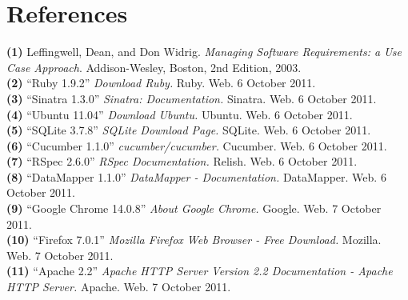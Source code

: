 \documentclass{article}
\begin{document}
\section{References}
\hangindent=1.4cm
\textbf{(1)} Leffingwell, Dean, and Don Widrig.
\emph{Managing Software Requirements: a Use Case Approach}.
Addison-Wesley, Boston,
2nd Edition,
2003.\\

\noindent\hangindent=1.4cm
\textbf{(2)} ``Ruby 1.9.2''
\emph{Download Ruby.} Ruby. Web.  6 October 2011. \\

\noindent\hangindent=1.4cm
\textbf{(3)} ``Sinatra 1.3.0''
\emph{Sinatra: Documentation.} Sinatra. Web.  6 October 2011.\\

\noindent\hangindent=1.4cm
\textbf{(4)} ``Ubuntu 11.04''
\emph{Download Ubuntu.} Ubuntu. Web.  6 October 2011.\\

\noindent\hangindent=1.4cm
\textbf{(5)} ``SQLite 3.7.8''
\emph{SQLite Download Page.} SQLite. Web.  6 October 2011.\\

\noindent\hangindent=1.4cm
\textbf{(6)} ``Cucumber 1.1.0''
\emph{cucumber/cucumber.} Cucumber. Web.  6 October 2011.\\

\noindent\hangindent=1.4cm
\textbf{(7)} ``RSpec 2.6.0''
\emph{RSpec Documentation.} Relish. Web.  6 October 2011.\\

\noindent\hangindent=1.4cm
\textbf{(8)} ``DataMapper 1.1.0''
\emph{DataMapper - Documentation.} DataMapper. Web.  6 October 2011.\\

\noindent\hangindent=1.4cm
\textbf{(9)} ``Google Chrome 14.0.8'' 
\emph{About Google Chrome.} Google. Web.  7 October 2011.\\

\noindent\hangindent=1.4cm
\textbf{(10)} ``Firefox 7.0.1''
\emph{Mozilla Firefox Web Browser - Free Download.} Mozilla. Web.  7 October 2011.\\

\noindent\hangindent=1.4cm
\textbf{(11)} ``Apache 2.2''
\emph{Apache HTTP Server Version 2.2 Documentation - Apache HTTP Server.} Apache. Web.  7 October 2011.\\
\end{document}
